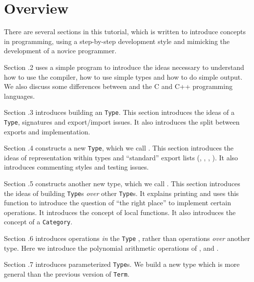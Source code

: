 %



\section{Overview}

There are several sections in this tutorial, which is written
to introduce concepts in \asharp{} programming, using a step-by-step
development style and mimicking the development of a novice \asharp{}
programmer. 

Section \thechapter.2 uses a simple \asharp{} program to
introduce the ideas necessary to understand 
how to use the compiler,
how to use simple types and how to do simple output. We also discuss some
differences between \asharp{} and the C and C++ programming languages.

Section \thechapter.3 introduces building an \asharp{} \verb"Type". This section introduces
the ideas of a \verb"Type", signatures and export/import issues. It also introduces
the split between exports and implementation.

Section \thechapter.4 constructs a new \verb"Type", which we call . 
This section introduces the
ideas of representation within types and ``standard'' export lists
(, , , ). It also
introduces commenting styles and testing issues.

Section \thechapter.5 constructs another new type, which we call . 
This section introduces the
ideas of building \verb"Type"s {\em over\/} other \verb"Type"s. It explains printing and uses
this function to introduce the question of ``the right place'' to implement
certain operations. It introduces the concept of local functions. It 
also introduces the concept of a \verb"Category".

Section \thechapter.6 introduces operations {\em in\/} the \verb"Type"
, rather than
operations {\em over\/} another type. Here we introduce the polynomial arithmetic
operations of \ttin{+}, \ttin{-} and \ttin{*}.

Section \thechapter.7 introduces parameterized \verb"Type"s. We build a new
 type which is more general than the previous version of
\verb"Term".


